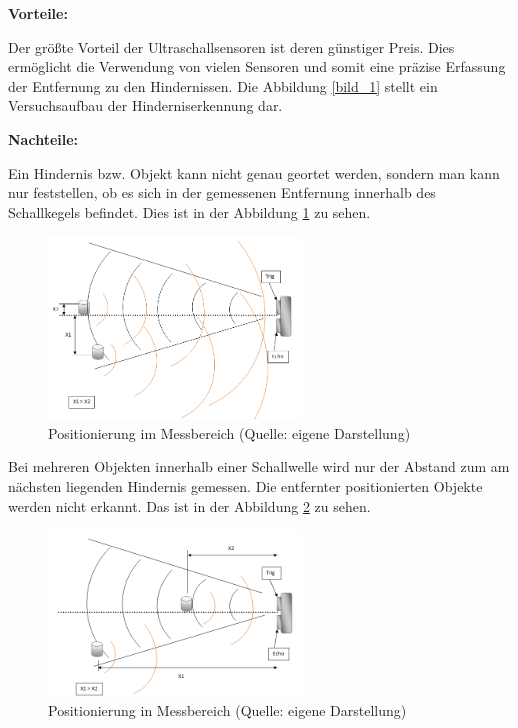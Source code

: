 \textbf{Vorteile:}  %

Der größte Vorteil der Ultraschallsensoren ist deren günstiger Preis. Dies ermöglicht die Verwendung von vielen Sensoren und somit eine präzise Erfassung der Entfernung zu den Hindernissen. Die Abbildung \ref{bild_1} stellt ein Versuchsaufbau der Hinderniserkennung dar.

\par\bigskip %
\textbf{Nachteile:}  %

Ein Hindernis bzw. Objekt kann nicht genau geortet werden, sondern man kann nur feststellen, ob es sich in der gemessenen Entfernung innerhalb des Schallkegels befindet.  Dies ist in der Abbildung \ref{bild_2} zu sehen.

\begin{figure}[ht]  %
	\centering\includegraphics[width=0.6\textwidth]{images/Bild-2.png}
	\caption{Positionierung im Messbereich \newline (Quelle: eigene Darstellung)}
	\label{bild_2} %
\end{figure}

Bei mehreren Objekten innerhalb einer Schallwelle wird nur der Abstand zum am nächsten liegenden Hindernis gemessen. Die entfernter positionierten Objekte werden nicht erkannt. Das ist in der Abbildung \ref{bild_3} zu sehen.

\begin{figure}[ht]  %
	\centering\includegraphics[width=0.6\textwidth]{images/Bild-3.png}
	\caption{Positionierung in Messbereich \newline (Quelle: eigene Darstellung)}
	\label{bild_3} %
\end{figure}

